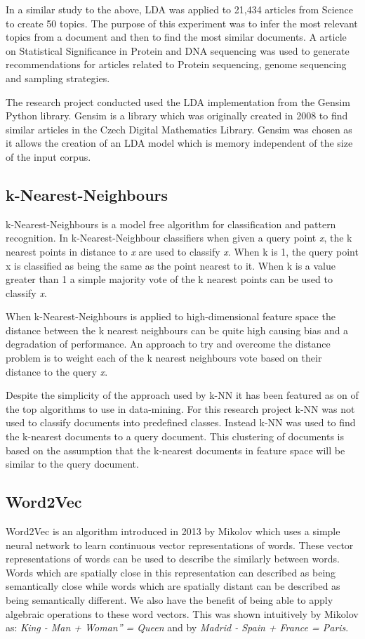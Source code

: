 In a similar study to the above, LDA was applied to 21,434 articles from Science to create 50 topics.
The purpose of this experiment was to infer the most relevant topics from a document and then to find the most similar documents.
A article on Statistical Significance in Protein and DNA sequencing was used to generate recommendations for articles related to Protein sequencing, genome sequencing and sampling strategies.

The research project conducted used the LDA implementation from the Gensim Python library.
Gensim is a library which was originally created in 2008 to find similar articles in the Czech Digital Mathematics Library.
Gensim was chosen as it allows the creation of an LDA model which is memory independent of the size of the input corpus.
\cite{rehurek_lrec}


\subsection{k-Nearest-Neighbours}
k-Nearest-Neighbours is a model free algorithm for classification and pattern recognition.
In k-Nearest-Neighbour classifiers when given a query point \textit{x}, the k nearest points in distance to \textit{x} are used to classify \textit{x}.
When k is 1, the query point x is classified as being the same as the point nearest to it.
When k is a value greater than 1 a simple majority vote of the k nearest points can be used to classify \textit{x}\cite{elementsStat}.

When k-Nearest-Neighbours is applied to high-dimensional feature space the distance between the k nearest neighbours can be quite high causing bias and a degradation of performance\cite{elementsStat}.
An approach to try and overcome the distance problem is to weight each of the k nearest neighbours vote based on their distance to the query \textit{x}\cite{top10datamining}.

Despite the simplicity of the approach used by k-NN it has been featured as on of the top algorithms to use in data-mining\cite{top10datamining}.
For this research project k-NN was not used to classify documents into predefined classes.
Instead k-NN was used to find the k-nearest documents to a query document.
This clustering of documents is based on the assumption that the k-nearest documents in feature space will be similar to the query document.

\subsection{Word2Vec}
Word2Vec is an algorithm introduced in 2013 by Mikolov which uses a simple neural network to learn continuous vector representations of words.
These vector representations of words can be used to describe the similarly between words.
Words which are spatially close in this representation can described as being semantically close while words which are spatially distant can be described as being semantically different.
We also have the benefit of being able to apply algebraic operations to these  word vectors.
This was shown intuitively by Mikolov as: \textit{King - Man + Woman” = Queen} and by \textit{Madrid - Spain + France = Paris}.

